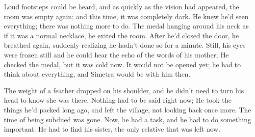 Loud footsteps could be heard, and as quickly as the vision had appeared, the room was empty again; and this time, it was completely dark. He knew he'd seen everything; there was nothing more to do. The medal hanging around his neck as if it was a normal necklace, he exited the room. After he'd closed the door, he breathed again, suddenly realizing he hadn't done so for a minute. Still, his eyes were frozen still and he could hear the echo of the words of his mother; He checked the medal, but it was cold now. It would not be opened yet; he had to think about everything, and Simetra would be with him then.

The weight of a feather dropped on his shoulder, and he didn't need to turn his head to know she was there. 
Nothing had to be said right now; He took the things he'd packed long ago, and left the village, not looking back once more. 
The time of being subdued was gone. Now, he had a task, and he had to do something important: He had to find his sister, the only relative that was left now. 
